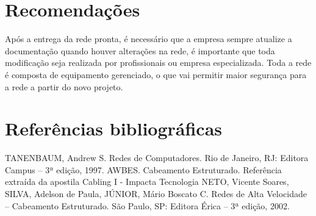 \documentclass[	DIV=calc,%
							paper=a4,%
							fontsize=12pt,%
							onecolumn]{scrartcl}	 					%
\begin{document}
\section{Recomendações}
Após a entrega da rede pronta, é necessário que a empresa sempre atualize a documentação quando houver alterações na rede, é importante que toda modificação seja realizada por profissionais ou empresa especializada.
Toda a rede é composta de equipamento gerenciado, o que vai permitir maior segurança para a rede a partir do novo projeto.
\section{Referências bibliográficas}
TANENBAUM, Andrew S. Redes de Computadores. Rio de Janeiro, RJ: Editora
Campus – 3ª edição, 1997.
AWBES. Cabeamento Estruturado. Referência extraída da apostila Cabling I - Impacta
Tecnologia 
NETO, Vicente Soares, SILVA, Adelson de Paula, JÚNIOR, Mário Boscato C. Redes de
Alta Velocidade – Cabeamento Estruturado. São Paulo, SP: Editora Érica – 3ª edição,
2002.

\renewcommand\refname{} %

  



\end{document}
